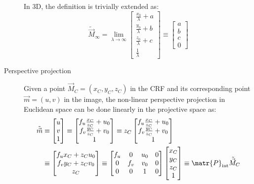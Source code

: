 \begin{description}
        In 3D, the definition is trivially extended as:
        \[ 
            \tilde{\vec{M}}_\infty = 
            \lim_{\lambda \rightarrow \infty} \begin{bmatrix} \frac{x_0}{\lambda} + a \\ \frac{y_0}{\lambda} + b \\ \frac{z_0}{\lambda} + c \\ \frac{1}{\lambda} \end{bmatrix} \equiv
            \begin{bmatrix} a \\ b \\ c \\ 0 \end{bmatrix}
        \]

    \item[Perspective projection] 
        Given a point $\vec{M}_C = (x_C, y_C, z_C)$ in the CRF and its corresponding point $\vec{m} = (u, v)$ in the image,
        the non-linear perspective projection in Euclidean space can be done linearly in the projective space as:
        \[  
            \begin{split}
                \tilde{\vec{m}} &\equiv 
                \begin{bmatrix} u \\ v \\ 1 \end{bmatrix} \equiv
                \begin{bmatrix} f_u\frac{x_C}{z_C} + u_0 \\ f_v\frac{y_C}{z_C} +v_0 \\ 1 \end{bmatrix} \equiv
                z_C \begin{bmatrix} f_u\frac{x_C}{z_C} + u_0 \\ f_v\frac{y_C}{z_C} +v_0 \\ 1 \end{bmatrix} \\
                &\equiv \begin{bmatrix} f_u x_C + z_C u_0 \\ f_v y_C + z_C v_0 \\ z_C \end{bmatrix} \equiv
                \begin{bmatrix} f_u & 0 & u_0 & 0 \\ 0 & f_v & v_0 & 0 \\ 0 & 0 & 1 & 0 \end{bmatrix} \begin{bmatrix} x_C \\ y_C \\ z_C \\ 1 \end{bmatrix} \equiv
                \matr{P}_\text{int} \tilde{\vec{M}}_C
            \end{split}
        \]


\end{description}
